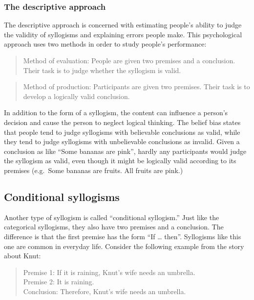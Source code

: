 \documentclass[
]{krantz}
\begin{document}
\subsubsection*{The descriptive approach}\label{the-descriptive-approach}


The descriptive approach is concerned with estimating people's ability to judge the validity of syllogisms and explaining errors people make. This psychological approach uses two methods in order to study people's performance:

\begin{quote}
Method of evaluation: People are given two premises and a conclusion. Their task is to judge whether the syllogism is valid.
\end{quote}

\begin{quote}
Method of production: Participants are given two premises. Their task is to develop a logically valid conclusion.
\end{quote}

In addition to the form of a syllogism, the content can influence a person's decision and cause the person to neglect logical thinking. The belief bias states that people tend to judge syllogisms with believable conclusions as valid, while they tend to judge syllogisms with unbelievable conclusions as invalid. Given a conclusion as like ``Some bananas are pink'', hardly any participants would judge the syllogism as valid, even though it might be logically valid according to its premises (e.g.~Some bananas are fruits. All fruits are pink.)

\subsection*{Conditional syllogisms}\label{conditional-syllogisms}


Another type of syllogism is called ``conditional syllogism.'' Just like the categorical syllogisms, they also have two premises and a conclusion. The difference is that the first premise has the form ``If \ldots{} then''. Syllogisms like this one are common in everyday life. Consider the following example from the story about Knut:

\begin{quote}
Premise 1: If it is raining, Knut's wife needs an umbrella.\\
Premise 2: It is raining.\\
Conclusion: Therefore, Knut's wife needs an umbrella.
\end{quote}
\end{document}

